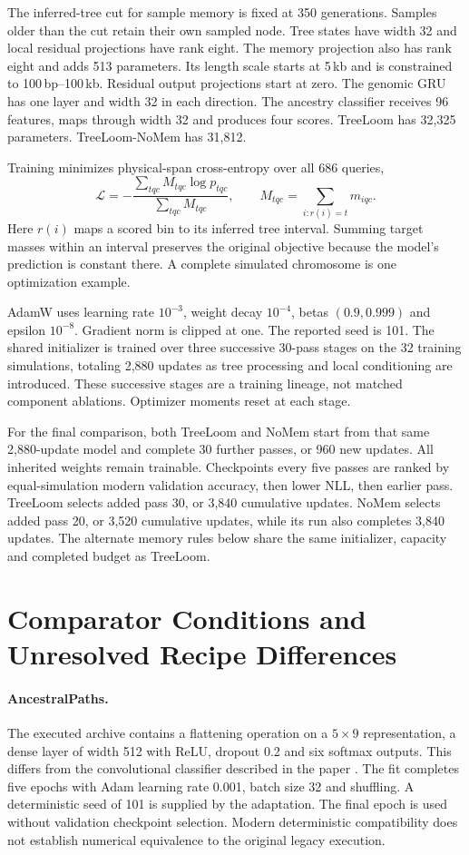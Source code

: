 \documentclass[letterpaper]{article}
\begin{document}
The inferred-tree cut for sample memory is fixed at 350 generations. Samples older than the cut retain their own sampled node. Tree states have width 32 and local residual projections have rank eight. The memory projection also has rank eight and adds 513 parameters. Its length scale starts at 5\,kb and is constrained to 100\,bp--100\,kb. Residual output projections start at zero. The genomic GRU has one layer and width 32 in each direction. The ancestry classifier receives 96 features, maps through width 32 and produces four scores. TreeLoom has 32,325 parameters. TreeLoom-NoMem has 31,812.

Training minimizes physical-span cross-entropy over all 686 queries,
\begin{equation}
\mathcal L=
-\frac{\sum_{tqc}M_{tqc}\log p_{tqc}}{\sum_{tqc}M_{tqc}},
\qquad
M_{tqc}=\sum_{i:r(i)=t}m_{iqc}.
\end{equation}
Here $r(i)$ maps a scored bin to its inferred tree interval. Summing target masses within an interval preserves the original objective because the model's prediction is constant there. A complete simulated chromosome is one optimization example.

AdamW uses learning rate $10^{-3}$, weight decay $10^{-4}$, betas $(0.9,0.999)$ and epsilon $10^{-8}$. Gradient norm is clipped at one. The reported seed is 101. The shared initializer is trained over three successive 30-pass stages on the 32 training simulations, totaling 2,880 updates as tree processing and local conditioning are introduced. These successive stages are a training lineage, not matched component ablations. Optimizer moments reset at each stage.

For the final comparison, both TreeLoom and NoMem start from that same 2,880-update model and complete 30 further passes, or 960 new updates. All inherited weights remain trainable. Checkpoints every five passes are ranked by equal-simulation modern validation accuracy, then lower NLL, then earlier pass. TreeLoom selects added pass 30, or 3,840 cumulative updates. NoMem selects added pass 20, or 3,520 cumulative updates, while its run also completes 3,840 updates. The alternate memory rules below share the same initializer, capacity and completed budget as TreeLoom.

\section{Comparator Conditions and Unresolved Recipe Differences}
\label{app:comparators}
\paragraph{AncestralPaths.}
The executed archive contains a flattening operation on a $5\times9$ representation, a dense layer of width 512 with ReLU, dropout 0.2 and six softmax outputs. This differs from the convolutional classifier described in the paper \citep{eurasians2024}. The fit completes five epochs with Adam learning rate 0.001, batch size 32 and shuffling. A deterministic seed of 101 is supplied by the adaptation. The final epoch is used without validation checkpoint selection. Modern deterministic compatibility does not establish numerical equivalence to the original legacy execution.
\end{document}
